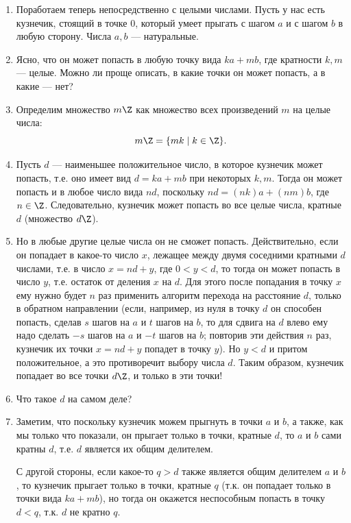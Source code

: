 \begin{enumerate}
\item Поработаем теперь непосредственно с целыми числами. Пусть у нас есть кузнечик, стоящий в точке 0, который умеет прыгать с шагом $a$ и с шагом $b$ в любую сторону. Числа $a,b$ --- натуральные.
\item Ясно, что он может попасть в любую точку вида $ka+mb$, где кратности $k,m$ --- целые. Можно ли проще описать, в какие точки он может попасть, а в какие --- нет?
\item Определим множество $m\Z$ как множество всех произведений $m$ на целые числа:
$$
m\Z = \{mk\mid k\in\Z\}.
$$
\item Пусть $d$ --- наименьшее положительное число, в которое кузнечик может попасть, т.е. оно имеет вид $d=ka+mb$ при некоторых $k,m$. Тогда он может попасть и в любое число вида $nd$, поскольку $nd=(nk)a+(nm)b$, где $n\in\Z$. Следовательно, кузнечик может попасть во все целые числа, кратные $d$ (множество $d\Z$).

\item Но в любые другие целые числа он не сможет попасть. Действительно, если он попадает в какое-то число $x$, лежащее между двумя соседними кратными $d$ числами, т.е. в число $x=nd+y$, где $0<y<d$, то тогда он может попасть в число $y$, т.е. остаток от деления $x$ на $d$. Для этого после попадания в точку $x$ ему нужно будет $n$ раз применить алгоритм перехода на расстояние $d$, только в обратном направлении (если, например, из нуля в точку $d$ он способен попасть, сделав $s$ шагов на $a$ и $t$ шагов на $b$, то для сдвига на $d$ влево ему надо сделать $-s$ шагов на $a$ и $-t$ шагов на $b$; повторив эти действия $n$ раз, кузнечик их точки $x=nd+y$ попадет в точку $y$).  Но $y<d$ и притом положительное, а это противоречит выбору числа $d$. Таким образом, кузнечик попадает во все точки $d\Z$, и только в эти точки!

\item Что такое $d$ на самом деле?

\item Заметим, что поскольку кузнечик можем прыгнуть в точки $a$ и $b$, а также, как мы только что показали, он прыгает только в точки, кратные $d$, то $a$ и $b$ сами кратны $d$, т.е. $d$ является их общим делителем.

С другой стороны, если какое-то $q>d$ также является общим делителем $a$ и $b$, то кузнечик прыгает только в точки, кратные $q$ (т.к. он попадает только в точки вида $ka+mb$), но тогда он окажется неспособным попасть в точку $d<q$, т.к. $d$ не кратно $q$.


\end{enumerate}
